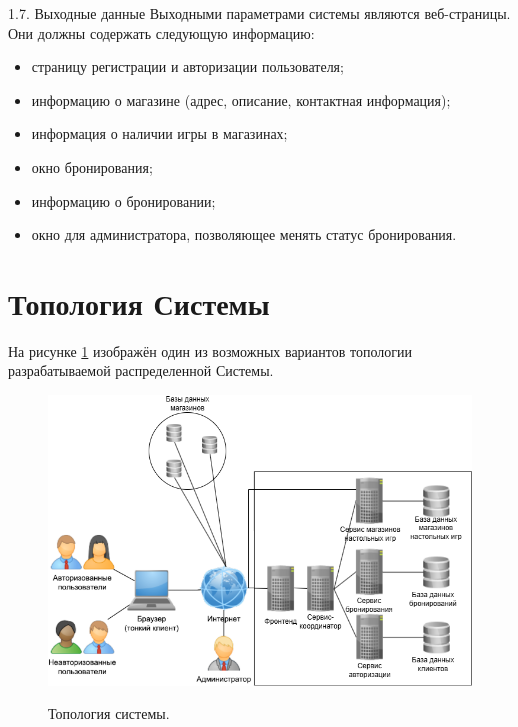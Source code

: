 1.7.	Выходные данные
Выходными параметрами системы являются веб-страницы. Они должны содержать следующую информацию:
\begin{itemize}
    \item страницу регистрации и авторизации пользователя;
    \item информацию о магазине (адрес, описание, контактная информация);
    \item информация о наличии игры в магазинах;
    \item окно бронирования;
    \item информацию о бронировании;
    \item окно для администратора, позволяющее менять статус бронирования.
\end{itemize}

\section*{Топология Системы}
На рисунке \ref{fig:topology} изображён один из возможных вариантов  топологии разрабатываемой распределенной Системы.
\begin{figure}[H]
	\begin{center}
		{\includegraphics[scale = 0.6]{img/топология.drawio.png}}
		\caption{Топология системы.}
		\label{fig:topology}
	\end{center}
\end{figure}


